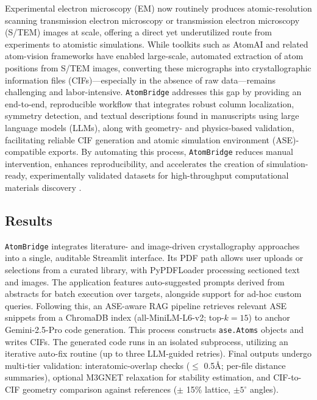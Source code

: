 Experimental electron microscopy (EM) now routinely produces atomic-resolution scanning transmission electron microscopy or transmission electron microscopy (S/TEM) images at scale, offering a direct yet underutilized route from experiments to atomistic simulations. While toolkits such as AtomAI \cite{ghosh2022bridging, ziatdinov2021atomai} and related atom-vision frameworks have enabled large-scale, automated extraction of atom positions from S/TEM images, converting these micrographs into crystallographic information files (CIFs)—especially in the absence of raw data—remains challenging and labor-intensive. \texttt{AtomBridge} addresses this gap by providing an end-to-end, reproducible workflow that integrates robust column localization, symmetry detection, and textual descriptions found in manuscripts using large language models (LLMs), along with geometry- and physics-based validation, facilitating reliable CIF generation and atomic simulation environment (ASE)-compatible exports. By automating this process, \texttt{AtomBridge} reduces manual intervention, enhances reproducibility, and accelerates the creation of simulation-ready, experimentally validated datasets for high-throughput computational materials discovery \cite{eliasson2024localization}.

\subsection*{Results}
\texttt{AtomBridge} integrates literature- and image-driven crystallography approaches into a single, auditable Streamlit interface. Its PDF path allows user uploads or selections from a curated library, with PyPDFLoader processing sectioned text and images. The application features auto-suggested prompts derived from abstracts for batch execution over targets, alongside support for ad-hoc custom queries. Following this, an ASE-aware RAG pipeline retrieves relevant ASE snippets from a ChromaDB index (all-MiniLM-L6-v2; top-$k=15$) to anchor Gemini-2.5-Pro code generation. This process constructs \texttt{ase.Atoms} objects and writes CIFs. The generated code runs in an isolated subprocess, utilizing an iterative auto-fix routine (up to three LLM-guided retries). Final outputs undergo multi-tier validation: interatomic-overlap checks ($\leq$ 0.5{\AA}; per-file distance summaries), optional M3GNET relaxation for stability estimation, and CIF-to-CIF geometry comparison against references ($\pm$ 15\% lattice, $\pm 5^\circ$ angles).

